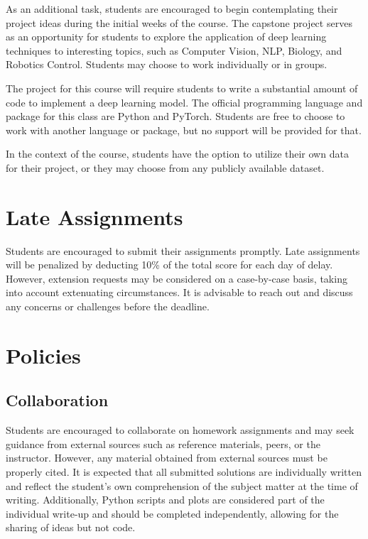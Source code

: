 \documentclass[
]{book}
\begin{document}
As an additional task, students are encouraged to begin contemplating their project ideas during the initial weeks of the course. The capstone project serves as an opportunity for students to explore the application of deep learning techniques to interesting topics, such as Computer Vision, NLP, Biology, and Robotics Control. Students may choose to work individually or in groups.

The project for this course will require students to write a substantial amount of code to implement a deep learning model. The official programming language and package for this class are Python and PyTorch. Students are free to choose to work with another language or package, but no support will be provided for that.

In the context of the course, students have the option to utilize their own data for their project, or they may choose from any publicly available dataset.

\hypertarget{late-assignments}{%
\section{Late Assignments}\label{late-assignments}}

Students are encouraged to submit their assignments promptly. Late assignments will be penalized by deducting 10\% of the total score for each day of delay. However, extension requests may be considered on a case-by-case basis, taking into account extenuating circumstances. It is advisable to reach out and discuss any concerns or challenges before the deadline.

\hypertarget{policies}{%
\section{Policies}\label{policies}}

\hypertarget{collaboration}{%
\subsection{Collaboration}\label{collaboration}}

Students are encouraged to collaborate on homework assignments and may seek guidance from external sources such as reference materials, peers, or the instructor. However, any material obtained from external sources must be properly cited. It is expected that all submitted solutions are individually written and reflect the student's own comprehension of the subject matter at the time of writing. Additionally, Python scripts and plots are considered part of the individual write-up and should be completed independently, allowing for the sharing of ideas but not code.
\end{document}
